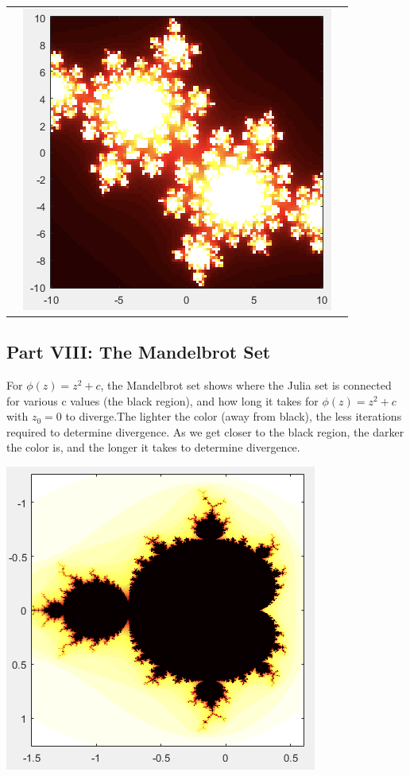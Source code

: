 \documentclass[11pt]{article}
\theoremstyle{plain}
\theoremstyle{definition}
\begin{document}
\begin{tabular}{c c c}
	&\includegraphics*[scale = 0.3]{Plot8.png} 
\end{tabular}

\subsection*{Part VIII: The Mandelbrot Set }
For $  \phi(z)=z^2+c $, the Mandelbrot set shows where the Julia set is connected for various c values (the black region), and how long it takes for $ \phi(z)=z^2+c $ with $ z_0=0 $ to diverge.The lighter the color (away from black), the less iterations required to determine divergence. As we get closer to the black region, the darker the color is, and the longer it takes to determine divergence.

\begin{center}
	\includegraphics*[scale = 0.5]{Plot9.png}
\end{center}
\end{document}
